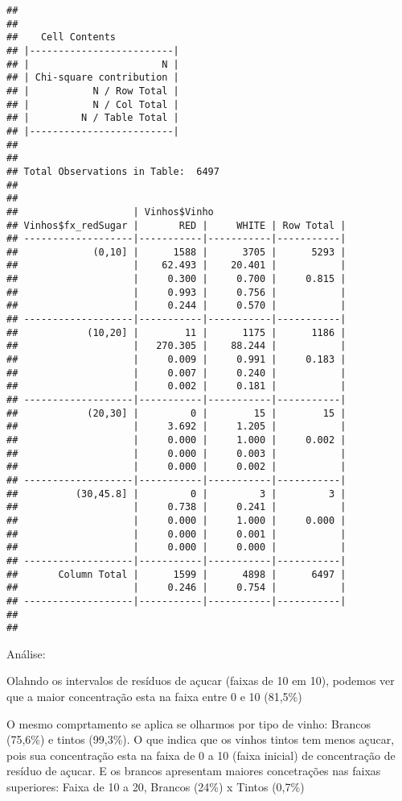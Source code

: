\documentclass[]{article}
\begin{document}
\begin{verbatim}
## 
##  
##    Cell Contents
## |-------------------------|
## |                       N |
## | Chi-square contribution |
## |           N / Row Total |
## |           N / Col Total |
## |         N / Table Total |
## |-------------------------|
## 
##  
## Total Observations in Table:  6497 
## 
##  
##                    | Vinhos$Vinho 
## Vinhos$fx_redSugar |       RED |     WHITE | Row Total | 
## -------------------|-----------|-----------|-----------|
##             (0,10] |      1588 |      3705 |      5293 | 
##                    |    62.493 |    20.401 |           | 
##                    |     0.300 |     0.700 |     0.815 | 
##                    |     0.993 |     0.756 |           | 
##                    |     0.244 |     0.570 |           | 
## -------------------|-----------|-----------|-----------|
##            (10,20] |        11 |      1175 |      1186 | 
##                    |   270.305 |    88.244 |           | 
##                    |     0.009 |     0.991 |     0.183 | 
##                    |     0.007 |     0.240 |           | 
##                    |     0.002 |     0.181 |           | 
## -------------------|-----------|-----------|-----------|
##            (20,30] |         0 |        15 |        15 | 
##                    |     3.692 |     1.205 |           | 
##                    |     0.000 |     1.000 |     0.002 | 
##                    |     0.000 |     0.003 |           | 
##                    |     0.000 |     0.002 |           | 
## -------------------|-----------|-----------|-----------|
##          (30,45.8] |         0 |         3 |         3 | 
##                    |     0.738 |     0.241 |           | 
##                    |     0.000 |     1.000 |     0.000 | 
##                    |     0.000 |     0.001 |           | 
##                    |     0.000 |     0.000 |           | 
## -------------------|-----------|-----------|-----------|
##       Column Total |      1599 |      4898 |      6497 | 
##                    |     0.246 |     0.754 |           | 
## -------------------|-----------|-----------|-----------|
## 
## 
\end{verbatim}

Análise:

Olahndo os intervalos de resíduos de açucar (faixas de 10 em 10),
podemos ver que a maior concentração esta na faixa entre 0 e 10 (81,5\%)

O mesmo comprtamento se aplica se olharmos por tipo de vinho: Brancos
(75,6\%) e tintos (99,3\%). O que indica que os vinhos tintos tem menos
açucar, pois sua concentração esta na faixa de 0 a 10 (faixa inicial) de
concentração de resíduo de açucar. E os brancos apresentam maiores
concetrações nas faixas superiores: Faixa de 10 a 20, Brancos (24\%) x
Tintos (0,7\%)
\end{document}
